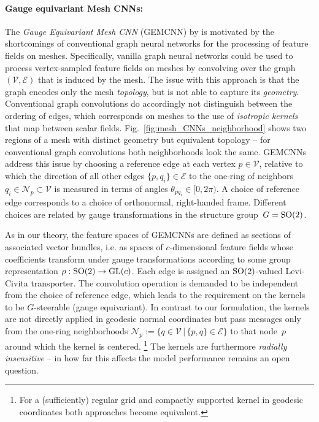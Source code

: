 \paragraph{Gauge equivariant Mesh CNNs:}
The \emph{Gauge Equivariant Mesh CNN} (GEMCNN) by \citet{deHaan2020meshCNNs} is motivated by the shortcomings of conventional graph neural networks for the processing of feature fields on meshes.
Specifically, vanilla graph neural networks could be used to process vertex-sampled feature fields on meshes by convolving over the graph $(\mathcal{V},\mathcal{E})$ that is induced by the mesh.
The issue with this approach is that the graph encodes only the mesh \emph{topology}, but is not able to capture its \emph{geometry}.
Conventional graph convolutions do accordingly not distinguish between the ordering of edges, which corresponds on meshes to the use of \emph{isotropic kernels} that map between scalar fields.
Fig.~\ref{fig:mesh_CNNs_neighborhood} shows two regions of a mesh with distinct geometry but equivalent topology -- for conventional graph convolutions both neighborhoods look the same.
GEMCNNs address this issue by choosing a reference edge at each vertex $p\in\mathcal{V}$, relative to which the direction of all other edges $\{p,q_i\} \in\mathcal{E}$ to the one-ring of neighbors $q_i\in \mathcal{N}_p \subset\mathcal{V}$ is measured in terms of angles $\theta_{pq_i} \in [0,2\pi)$.
A choice of reference edge corresponds to a choice of orthonormal, right-handed frame.
Different choices are related by gauge transformations in the structure group~$G=\operatorname{SO}(2)$.

As in our theory, the feature spaces of GEMCNNs are defined as sections of associated vector bundles, i.e. as spaces of $c$-dimensional feature fields whose coefficients transform under gauge transformations according to some group representation $\rho: \operatorname{SO}(2) \to \operatorname{GL}(c)$.
Each edge is assigned an $\operatorname{SO}(2)$-valued Levi-Civita transporter.
The convolution operation is demanded to be independent from the choice of reference edge, which leads to the requirement on the kernels to be $G$-steerable (gauge equivariant).
In contrast to our formulation, the kernels are not directly applied in geodesic normal coordinates but pass messages only from the one-ring neighborhoods $\mathcal{N}_p := \{q\in\mathcal{V} \,|\, \{p,q\}\in\mathcal{E} \}$ to that node~$p$ around which the kernel is centered.%
\footnote{
    For a (sufficiently) regular grid and compactly supported kernel in geodesic coordinates both approaches become equivalent.
}
The kernels are furthermore \emph{radially insensitive} --  in how far this affects the model performance remains an open question.

